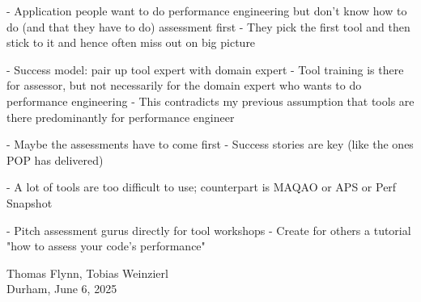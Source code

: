 - Application people want to do performance engineering but don't know how to do (and that they have to do) assessment first
- They pick the first tool and then stick to it and hence often miss out on big picture

- Success model: pair up tool expert with domain expert
- Tool training is there for assessor, but not necessarily for the domain expert who wants to do performance engineering
- This contradicts my previous assumption that tools are there predominantly for performance engineer

- Maybe the assessments have to come first
- Success stories are key (like the ones POP has delivered)

- A lot of tools are too difficult to use; counterpart is MAQAO or APS or Perf Snapshot

- Pitch assessment gurus directly for tool workshops
- Create for others a tutorial "how to assess your code's performance" 


\begin{flushright}
Thomas Flynn,
Tobias Weinzierl
\\
Durham, June 6, 2025
\end{flushright}



